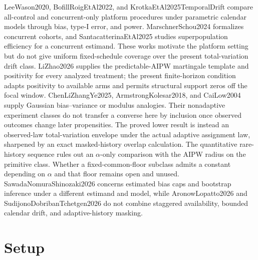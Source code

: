 \documentclass{article}
\begin{document}
LeeWason2020, BofillRoigEtAl2022, and KrotkaEtAl2025TemporalDrift compare all-control and concurrent-only platform procedures under parametric calendar models through bias, type-I error, and power. MarschnerSchou2024 formalizes concurrent cohorts, and SantacatterinaEtAl2025 studies superpopulation efficiency for a concurrent estimand. These works motivate the platform setting but do not give uniform fixed-schedule coverage over the present total-variation drift class. LiZhao2026 supplies the predictable-AIPW martingale template and positivity for every analyzed treatment; the present finite-horizon condition adapts positivity to available arms and permits structural support zeros off the focal window. ChenLiZhangYe2025, ArmstrongKolesar2018, and CaiLow2004 supply Gaussian bias--variance or modulus analogies. Their nonadaptive experiment classes do not transfer a converse here by inclusion once observed outcomes change later propensities. The proved lower result is instead an observed-law total-variation envelope under the actual adaptive assignment law, sharpened by an exact masked-history overlap calculation. The quantitative rare-history sequence rules out an \(\alpha\)-only comparison with the AIPW radius on the primitive class. Whether a fixed-common-floor subclass admits a constant depending on \(\alpha\) and that floor remains open and unused. SawadaNomuraShinozaki2026 concerns estimated bias caps and bootstrap inference under a different estimand and model, while AronowLopatto2026 and SudijonoDobribanTchetgen2026 do not combine staggered availability, bounded calendar drift, and adaptive-history masking.

\section{Setup}
\end{document}
